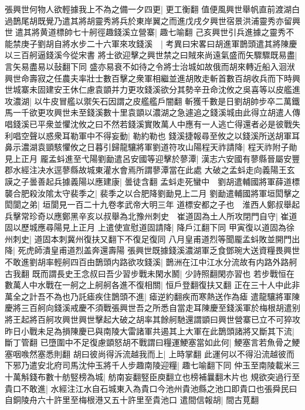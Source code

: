 張興世何物人欲輕據我上不為之備一夕四更|{
	更工衡翻}
值便風興世舉帆直前渡湖白過鵲尾胡既覺乃遣其將胡靈秀將兵於東岸翼之而進戊戌夕興世宿景洪浦靈秀亦留興世遣其將黄道標帥七十舸徑趣錢溪立營寨|{
	趣七喻翻}
己亥興世引兵進據之靈秀不能禁庚子劉胡自將水步二十六軍來攻錢溪　|{
	考異曰宋畧曰胡進軍鵲頭遣其將陳慶以三百舸逼錢溪今從宋書}
將士欲迎擊之興世禁之曰賊來尚遠氣盛而矢驟驟既易盡|{
	言矢易盡易以鼔翻下同}
盛亦易衰不如待之令將士治城如故俄而胡來轉近船入洄洑興世命壽寂之任農夫率壯士數百擊之衆軍相繼並進胡敗走斬首數百胡收兵而下時興世城寨未固建安王休仁慮袁顗并力更攻錢溪欲分其勢辛丑命沈攸之吳喜等以皮艦進攻濃湖|{
	以牛皮冒艦以禦矢石因謂之皮艦艦戶闇翻}
斬獲千數是日劉胡帥步卒二萬鐵馬一千欲更攻興世未至錢溪數十里袁顗以濃湖之急遽追之錢溪城由此得立胡遣人傳唱錢溪已平衆並懼沈攸之曰不然若錢溪實敗萬人中應有一人逃亡得還者必是彼戰失利唱空聲以惑衆耳勒軍中不得妄動|{
	勒約勒也}
錢溪捷報尋至攸之以錢溪所送胡軍耳鼻示濃湖袁顗駭懼攸之日暮引歸龍驤將軍劉道符攻山陽程天祚請降|{
	程天祚附子勛見上正月}
龎孟蚪進至弋陽劉勔遣呂安國等迎擊於蓼潭|{
	漢志六安國有蓼縣晉屬安豐郡水經注决水逕蓼縣故城東灌水會焉所謂蓼潭當在此處}
大破之孟蚪走向義陽王玄謨之子曇善起兵據義陽以應建康|{
	曇徒含翻}
孟蚪走死蠻中　劉胡遣輔國將軍薛道標襲合肥殺汝隂太守裴季之|{
	裴季之以合肥降劉勔見上二月}
劉勔遣輔國將軍垣閎擊之閎閬之弟|{
	垣閬見一百二十九卷孝武帝大明三年}
道標安都之子也　淮西人鄭叔舉起兵擊常珍奇以應鄭黑辛亥以叔舉為北豫州刺史　崔道固為土人所攻閉門自守|{
	崔道固以歷城應尋陽見上正月}
上遣使宣慰道固請降|{
	降戶江翻下同}
甲寅復以道固為徐州刺史|{
	道固本刺冀州復扶又翻下不復足復同}
八月皇甫道烈等聞龎孟蚪敗並開門出降|{
	死虎師潰皇甫道烈盖奔還壽陽}
張興世既據錢溪濃湖軍乏食鄧琬大送資糧畏興世不敢進劉胡率輕舸四百由鵲頭内路欲攻錢溪|{
	鵲洲在江中江水分流故有内路外路舸古我翻}
既而謂長史王念叔曰吾少習步戰未閑水鬭|{
	少詩照翻閑亦習也}
若步戰恒在數萬人中水戰在一舸之上舸舸各進不復相關|{
	恒戶登翻復扶又翻}
正在三十人中此非萬全之計吾不為也乃託瘧疾住鵲頭不進|{
	瘧逆約翻疾而寒熱送作為瘧}
遣龍驤將軍陳慶將三百舸向錢溪戒慶不須戰張興世吾之所悉自當走耳陳慶至錢溪軍於梅根胡遣别將王起將百舸攻興世興世擊起大破之胡率其餘舸馳還謂顗曰興世營寨已立不可猝攻昨日小戰未足為損陳慶已與南陵大雷諸軍共遏其上大軍在此鵲頭諸將又斷其下流|{
	斷丁管翻}
已墮圍中不足復慮顗怒胡不戰謂曰糧運鯁塞當如此何|{
	鯁塞言若魚骨之鯁塞咽㗋然塞悉則翻}
胡曰彼尚得泝流越我而上|{
	上時掌翻}
此運何以不得沿流越彼而下邪乃遣安北府司馬沈仲玉將千人步趣南陵迎糧|{
	趣七喻翻下同}
仲玉至南陵載米三十萬斛錢布數十舫竪榜為城|{
	舫南妄翻竪臣庾翻立也榜補曩翻木片也}
規欲突過行至貴口不敢進|{
	水經注江水自石城東入為貴口今池州貴池縣之池口即貴口也張舜民曰自銅陵舟六十許里至梅根港又五十許里至貴池口}
遣間信報胡|{
	間古莧翻}
